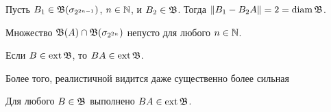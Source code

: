 \begin{hypothesis}
	Пусть $B_1 \in \mathfrak{B}(\sigma_{2^{2n-1}})$, $n\in\mathbb{N}$, и $B_2\in \mathfrak{B}$.
	Тогда $\|B_1 - B_2 A\| = 2 = \operatorname{diam} \mathfrak{B}$.
\end{hypothesis}

\begin{hypothesis}
	Множество $\mathfrak{B}(A) \cap \mathfrak{B} (\sigma_{2^{2n}})$ непусто для любого $n\in \mathbb{N}$.
\end{hypothesis}

\begin{hypothesis}
	Если $B\in\operatorname{ext}\mathfrak{B}$, то $BA \in \operatorname{ext} \mathfrak{B}$.
\end{hypothesis}

Более того, реалистичной видится даже существенно более сильная

\begin{hypothesis}
	Для любого $B\in\mathfrak{B}$ выполнено $BA \in \operatorname{ext} \mathfrak{B}$.
\end{hypothesis}

